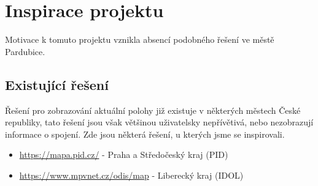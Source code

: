 \section{Inspirace projektu}
Motivace k tomuto projektu vznikla absencí podobného řešení ve městě Pardubice.
\subsection{Existující řešení}
Řešení pro zobrazování aktuální polohy již existuje v některých městech České republiky, tato řešení jsou však většinou uživatelsky nepřívětivá, nebo nezobrazují informace o spojení. Zde jsou některá řešení, u kterých jsme se inspirovali.

\begin{itemize}
    \item \url{https://mapa.pid.cz/} - Praha a Středočeský kraj (PID)
    \item \url{https://www.mpvnet.cz/odis/map} - Liberecký kraj (IDOL)
\end{itemize}